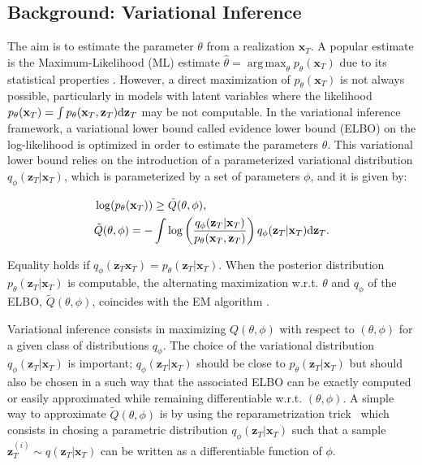 \documentclass{article}
\DeclareMathOperator*{\argmax}{arg\,max}
\def\x{{\mathbf x}}
\def\z{{\mathbf z}}
\def\p{p_{\theta}}
\def\q{q_\phi}
\def\Q{\tilde{Q}}
\begin{document}
\subsection{Background: Variational Inference}
\label{subsec:varinf}
The aim is to estimate the parameter $\theta$ from a realization $\x_T$. 
A popular estimate is the Maximum-Likelihood (ML) estimate 
$\hat{\theta}=\argmax_{\theta} \p(\x_T)$
due to its statistical properties \cite{White-MLE, Douc-ML-MIS}.
However, a direct maximization of $\p(\x_T)$ is not always possible, particularly in
models with latent variables where the likelihood
$\p(\x_T)=\int \p(\x_T,\z_T) {\rm d}\z_T$ may be not computable. 
In the variational inference framework, a variational lower bound called evidence lower bound 
(ELBO) on the log-likelihood  is optimized in order to estimate the parameters $\theta$.
This variational lower bound relies on the introduction of a parameterized 
variational distribution $\q(\z_T|\x_T)$, which is parameterized by a set of parameters $\phi$, 
and it is given by: 

\vspace{-0.2cm}
\begin{align}
&\log(\p(\x_T)) \geq \Q(\theta,\phi) \text{,} \nonumber \\
\label{eq:elbo}
&\Q(\theta,\phi) = - \int \log \left(\frac{\q(\z_T|\x_T)}{\p(\x_T,\z_T)}\right) \q(\z_T|\x_T) {\rm d} \z_T \text{.}
\end{align}
\vspace{-0.3cm}

Equality holds if $\q(\z_T\x_T)= \p(\z_T|\x_T)$.
When the posterior distribution $\p(\z_T|\x_T)$ is  computable, the alternating 
maximization w.r.t. $\theta$ and $\q$  of the ELBO, $\Q(\theta,\phi)$,
coincides with the EM algorithm \cite{variational-EM}. 

Variational inference consists in maximizing $Q(\theta,\phi)$ 
with respect to $(\theta,\phi)$ for a given class of distributions $\q$. 
The choice of the variational distribution $\q(\z_T|\x_T)$ is important; 
$\q(\z_T|\x_T)$ should be close to $\p(\z_T|\x_T)$ but should also
be chosen in a such way that the associated ELBO can be exactly computed or 
easily approximated while remaining differentiable w.r.t. $(\theta,\phi)$. 
A simple way to approximate $\Q(\theta,\phi)$ is by using the reparametrization 
trick~\cite{kingma2013auto} which consists in chosing a parametric
distribution $\q(\z_T|\x_T)$ such that a sample $\z_T^{(i)} \sim q(\z_T|\x_T)$ can
be written as a differentiable function of $\phi$.
\end{document}
